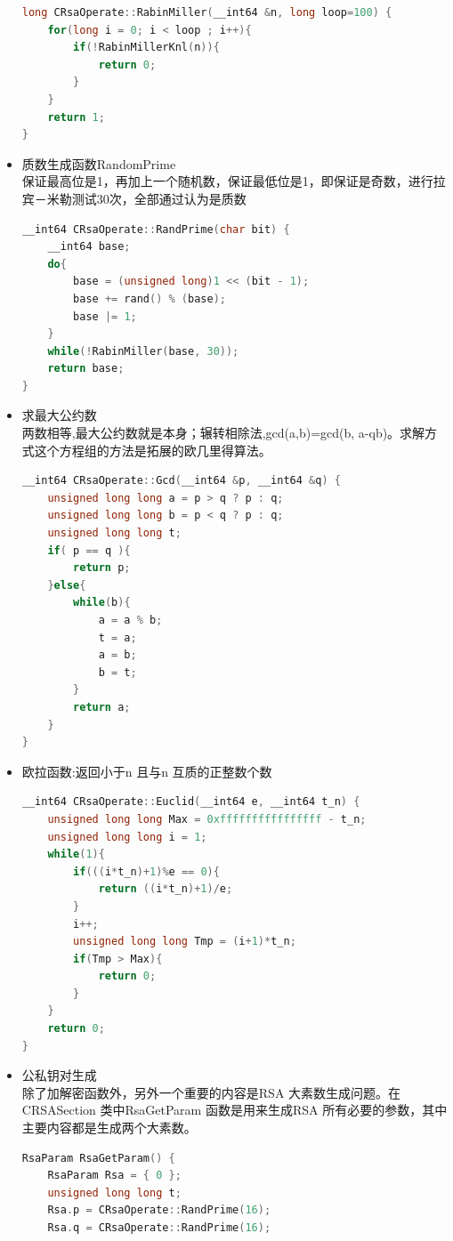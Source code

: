 \documentclass[UTF8,a4paper,10pt]{ctexart}
\begin{document}
\begin{itemize}
\begin{lstlisting}[language = c++]
long CRsaOperate::RabinMiller(__int64 &n, long loop=100) {
    for(long i = 0; i < loop ; i++){
        if(!RabinMillerKnl(n)){
            return 0;
        }
    }
    return 1;
}
  \end{lstlisting}
  \item 质数生成函数RandomPrime\\ 
  保证最高位是1，再加上一个随机数，保证最低位是1，即保证是奇数，进行拉宾－米勒测试30次，全部通过认为是质数
  \begin{lstlisting}[language = C++]
__int64 CRsaOperate::RandPrime(char bit) {
    __int64 base;
    do{
        base = (unsigned long)1 << (bit - 1);
        base += rand() % (base);
        base |= 1;
    }
    while(!RabinMiller(base, 30));
    return base;
}
  \end{lstlisting}
  \item 求最大公约数\\
  两数相等,最大公约数就是本身；辗转相除法,gcd(a,b)=gcd(b, a-qb)。求解方式这个方程组的方法是拓展的欧几里得算法。
  \begin{lstlisting}[language = C++]
__int64 CRsaOperate::Gcd(__int64 &p, __int64 &q) {
    unsigned long long a = p > q ? p : q;
    unsigned long long b = p < q ? p : q;
    unsigned long long t;
    if( p == q ){
        return p;
    }else{
        while(b){
            a = a % b;
            t = a;
            a = b;
            b = t;
        }
        return a;
    }
}
  \end{lstlisting}
  \item 欧拉函数:返回小于n 且与n 互质的正整数个数
  \begin{lstlisting}[language = C++]
__int64 CRsaOperate::Euclid(__int64 e, __int64 t_n) { 
    unsigned long long Max = 0xffffffffffffffff - t_n;
    unsigned long long i = 1;
    while(1){
        if(((i*t_n)+1)%e == 0){
            return ((i*t_n)+1)/e;
        }
        i++;
        unsigned long long Tmp = (i+1)*t_n;
        if(Tmp > Max){
            return 0;
        }
    }
    return 0;
}    
  \end{lstlisting}
  \item 公私钥对生成\\
  除了加解密函数外，另外一个重要的内容是RSA 大素数生成问题。在CRSASection 类中RsaGetParam 函数是用来生成RSA 所有必要的参数，其中主要内容都是生成两个大素数。
  \begin{lstlisting}[language = C++]
RsaParam RsaGetParam() {
    RsaParam Rsa = { 0 };
    unsigned long long t;
    Rsa.p = CRsaOperate::RandPrime(16);
    Rsa.q = CRsaOperate::RandPrime(16);

\end{lstlisting}
\end{itemize}
\end{document}
